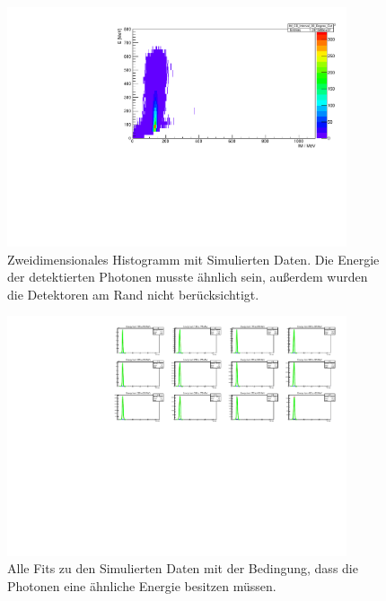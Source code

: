 \documentclass[a4paper,11pt,oneside,final,german,openbib,pdftex]{scrbook}
\begin{document}
{\begin{appendix}
\begin{figure}[h!]
	\begin{center}
		\includegraphics[width=100mm]{20171804SimData2DHist30DegreeEdge}
		\caption{Zweidimensionales Histogramm mit Simulierten Daten. Die Energie der detektierten Photonen musste \"ahnlich sein, au{\ss}erdem wurden die Detektoren am Rand nicht ber\"ucksichtigt.}
		\label{fig:Sim-Data-2DHist-30-Degree-Edge}
	\end{center}
\end{figure}


\begin{figure}[h!]
	\begin{center}
		\includegraphics[width=100mm]{20171804NoCutAllFits}
		\caption{Alle Fits zu den Simulierten Daten mit der Bedingung, dass die Photonen eine \"ahnliche Energie besitzen m\"ussen.}
		\label{fig:Sim-No-Cut-All-Fits}
	\end{center}
\end{figure}



\end{appendix}}
\end{document}
